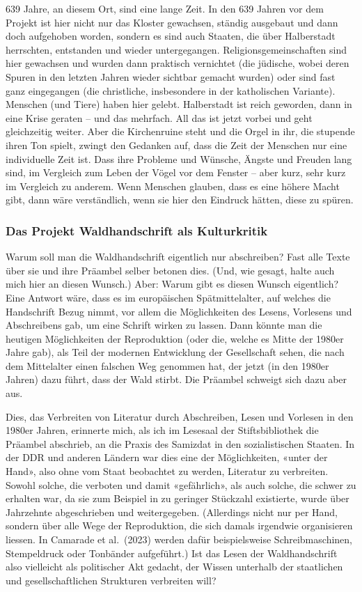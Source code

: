\documentclass[a4paper,
fontsize=11pt,
oneside,
numbers=noperiodatend,
parskip=half-,
bibliography=totoc,
final
]{scrartcl}
\begin{document}
639 Jahre, an diesem Ort, sind eine lange Zeit. In den 639 Jahren vor
dem Projekt ist hier nicht nur das Kloster gewachsen, ständig ausgebaut
und dann doch aufgehoben worden, sondern es sind auch Staaten, die über
Halberstadt herrschten, entstanden und wieder untergegangen.
Religionsgemeinschaften sind hier gewachsen und wurden dann praktisch
vernichtet (die jüdische, wobei deren Spuren in den letzten Jahren
wieder sichtbar gemacht wurden) oder sind fast ganz eingegangen (die
christliche, insbesondere in der katholischen Variante). Menschen (und
Tiere) haben hier gelebt. Halberstadt ist reich geworden, dann in eine
Krise geraten -- und das mehrfach. All das ist jetzt vorbei und geht
gleichzeitig weiter. Aber die Kirchenruine steht und die Orgel in ihr,
die stupende ihren Ton spielt, zwingt den Gedanken auf, dass die Zeit
der Menschen nur eine individuelle Zeit ist. Dass ihre Probleme und
Wünsche, Ängste und Freuden lang sind, im Vergleich zum Leben der Vögel
vor dem Fenster -- aber kurz, sehr kurz im Vergleich zu anderem. Wenn
Menschen glauben, dass es eine höhere Macht gibt, dann wäre
verständlich, wenn sie hier den Eindruck hätten, diese zu spüren.

\subsubsection{Das Projekt Waldhandschrift als
Kulturkritik}\label{das-projekt-waldhandschrift-als-kulturkritik}

Warum soll man die Waldhandschrift eigentlich nur abschreiben? Fast alle
Texte über sie und ihre Präambel selber betonen dies. (Und, wie gesagt,
halte auch mich hier an diesen Wunsch.) Aber: Warum gibt es diesen
Wunsch eigentlich? Eine Antwort wäre, dass es im europäischen
Spätmittelalter, auf welches die Handschrift Bezug nimmt, vor allem die
Möglichkeiten des Lesens, Vorlesens und Abschreibens gab, um eine
Schrift wirken zu lassen. Dann könnte man die heutigen Möglichkeiten der
Reproduktion (oder die, welche es Mitte der 1980er Jahre gab), als Teil
der modernen Entwicklung der Gesellschaft sehen, die nach dem
Mittelalter einen falschen Weg genommen hat, der jetzt (in den 1980er
Jahren) dazu führt, dass der Wald stirbt. Die Präambel schweigt sich
dazu aber aus.

Dies, das Verbreiten von Literatur durch Abschreiben, Lesen und Vorlesen
in den 1980er Jahren, erinnerte mich, als ich im Lesesaal der
Stiftsbibliothek die Präambel abschrieb, an die Praxis des Samizdat in
den sozialistischen Staaten. In der DDR und anderen Ländern war dies
eine der Möglichkeiten, «unter der Hand», also ohne vom Staat beobachtet
zu werden, Literatur zu verbreiten. Sowohl solche, die verboten und
damit «gefährlich», als auch solche, die schwer zu erhalten war, da sie
zum Beispiel in zu geringer Stückzahl existierte, wurde über Jahrzehnte
abgeschrieben und weitergegeben. (Allerdings nicht nur per Hand, sondern
über alle Wege der Reproduktion, die sich damals irgendwie organisieren
liessen. In Camarade et al.~(2023) werden dafür beispielsweise
Schreibmaschinen, Stempeldruck oder Tonbänder aufgeführt.) Ist das Lesen
der Waldhandschrift also vielleicht als politischer Akt gedacht, der
Wissen unterhalb der staatlichen und gesellschaftlichen Strukturen
verbreiten will?
\end{document}
